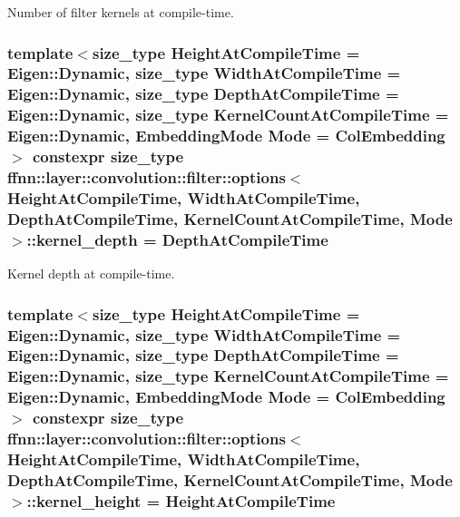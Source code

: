 Number of filter kernels at compile-\/time. 

\hypertarget{structffnn_1_1layer_1_1convolution_1_1filter_1_1options_a699036320138871693bcd0ecfb977d6b}{
\subsubsection[{kernel\-\_\-depth}]{\setlength{\rightskip}{0pt plus 5cm}template$<$size\-\_\-type Height\-At\-Compile\-Time = Eigen\-::\-Dynamic, size\-\_\-type Width\-At\-Compile\-Time = Eigen\-::\-Dynamic, size\-\_\-type Depth\-At\-Compile\-Time = Eigen\-::\-Dynamic, size\-\_\-type Kernel\-Count\-At\-Compile\-Time = Eigen\-::\-Dynamic, Embedding\-Mode Mode = Col\-Embedding$>$ constexpr {\bf size\-\_\-type} {\bf ffnn\-::layer\-::convolution\-::filter\-::options}$<$ Height\-At\-Compile\-Time, Width\-At\-Compile\-Time, Depth\-At\-Compile\-Time, Kernel\-Count\-At\-Compile\-Time, Mode $>$\-::kernel\-\_\-depth = Depth\-At\-Compile\-Time\hspace{0.3cm}{\ttfamily [static]}}}\label{structffnn_1_1layer_1_1convolution_1_1filter_1_1options_a699036320138871693bcd0ecfb977d6b}


Kernel depth at compile-\/time. 

\hypertarget{structffnn_1_1layer_1_1convolution_1_1filter_1_1options_a89572b22e67e07c6f68d5c51070b0dbf}{
\subsubsection[{kernel\-\_\-height}]{\setlength{\rightskip}{0pt plus 5cm}template$<$size\-\_\-type Height\-At\-Compile\-Time = Eigen\-::\-Dynamic, size\-\_\-type Width\-At\-Compile\-Time = Eigen\-::\-Dynamic, size\-\_\-type Depth\-At\-Compile\-Time = Eigen\-::\-Dynamic, size\-\_\-type Kernel\-Count\-At\-Compile\-Time = Eigen\-::\-Dynamic, Embedding\-Mode Mode = Col\-Embedding$>$ constexpr {\bf size\-\_\-type} {\bf ffnn\-::layer\-::convolution\-::filter\-::options}$<$ Height\-At\-Compile\-Time, Width\-At\-Compile\-Time, Depth\-At\-Compile\-Time, Kernel\-Count\-At\-Compile\-Time, Mode $>$\-::kernel\-\_\-height = Height\-At\-Compile\-Time\hspace{0.3cm}{\ttfamily [static]}}}\label{structffnn_1_1layer_1_1convolution_1_1filter_1_1options_a89572b22e67e07c6f68d5c51070b0dbf}


